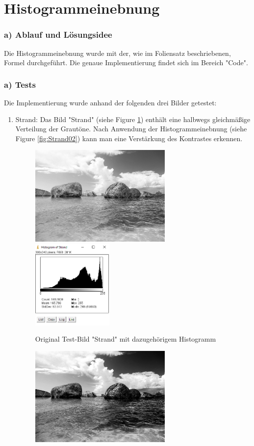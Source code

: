 \documentclass[12pt,german]{article}
\begin{document}
\section{Histogrammeinebnung  }

\subsubsection{a) Ablauf und Lösungsidee}
 Die Histogrammeinebnung wurde mit der, wie im Foliensatz beschriebenen, Formel durchgeführt. Die genaue Implementierung findet sich im Bereich "Code". 
\subsubsection{a) Tests}
Die Implementierung wurde anhand der folgenden drei Bilder getestet:
\begin{enumerate}
\item Strand: 
Das Bild "Strand" (siehe Figure \ref{fig:Strand01}) enthält eine halbwegs gleichmäßige Verteilung der Grautöne. Nach Anwendung der Histogrammeinebnung  (siehe Figure \ref{fig:Strand02}) kann man eine Verstärkung des Kontrastes erkennen.
\begin{figure}[H] \centering
	\includegraphics[width=7cm]{../testData/Results/Strand/Strand.jpg}
	\includegraphics[width=4cm]{../testData/Results/Strand/Strand-histogram.png}
	\caption{Original Test-Bild "Strand" mit dazugehörigem Histogramm}
	 \label{fig:Strand01}
\end{figure}
\begin{figure}[H] \centering
	\includegraphics[width=7cm]{../testData/Results/Strand/Strand-equalized.jpg}

\end{figure}
\end{enumerate}
\end{document}
